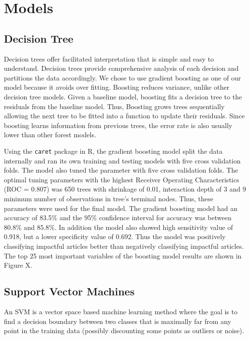 \documentclass[10pt,letterpaper]{article}
\begin{document}
\section{Models}\label{models}

\subsection{Decision Tree}\label{decision-tree}

Decision trees offer facilitated interpretation that is simple and easy
to understand. Decision trees provide comprehensive analysis of each
decision and partitions the data accordingly. We chose to use gradient
boosting as one of our model because it avoids over fitting. Boosting
reduces variance, unlike other decision tree models. Given a baseline
model, boosting fits a decision tree to the residuals from the baseline
model. Thus, Boosting grows trees sequentially allowing the next tree to
be fitted into a function to update their residuals. Since boosting
learns information from previous trees, the error rate is also usually
lower than other forest models.

Using the \texttt{caret} package in R, the gradient boosting model split
the data internally and ran its own training and testing models with
five cross validation folds. The model also tuned the parameter with
five cross validation folds. The optimal tuning parameters with the
highest Receiver Operating Characteristics (ROC = 0.807) was 650 trees
with shrinkage of 0.01, interaction depth of 3 and 9 minimum number of
observations in tree's terminal nodes. Thus, these parameters were used
for the final model. The gradient boosting model had an accuracy of
83.5\% and the 95\% confidence interval for accuracy was between 80.8\%
and 85.8\%. In addition the model also showed high sensitivity value of
0.918, but a lower specificity value of 0.692. Thus the model was
positively classifying impactful articles better than negatively
classifying impactful articles. The top 25 most important variables of
the boosting model results are shown in Figure X.

\subsection{Support Vector Machines}\label{support-vector-machines}

An SVM is a vector space based machine learning method where the goal is
to find a decision boundary between two classes that is maximally far
from any point in the training data (possibly discounting some points as
outliers or noise).
\end{document}
